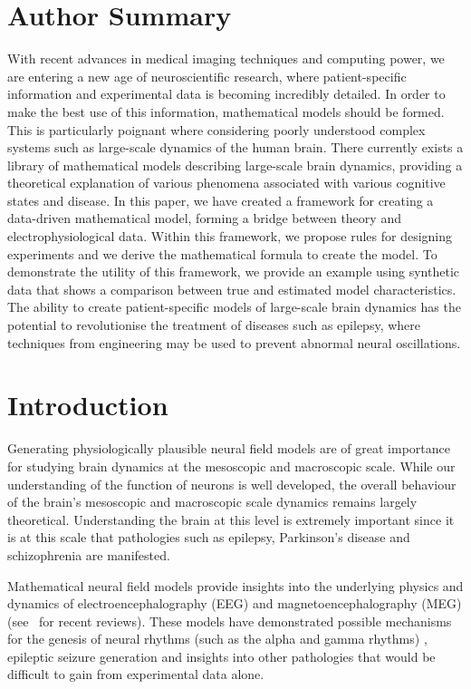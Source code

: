 \documentclass[10pt]{article}
\begin{document}
\section*{Author Summary}
With recent advances in medical imaging techniques and computing power, we are entering a new age of neuroscientific research, where patient-specific information and experimental data is becoming incredibly detailed. In order to make the best use of this information, mathematical models should be formed. This is particularly poignant where considering poorly understood complex systems such as large-scale dynamics of the human brain. There currently exists a library of mathematical models describing large-scale brain dynamics, providing a theoretical explanation of various phenomena associated with various cognitive states and disease. In this paper, we have created a framework for creating a data-driven mathematical model, forming a bridge between theory and electrophysiological data. Within this framework, we propose rules for designing experiments and we derive the mathematical formula to create the model. To demonstrate the utility of this framework, we provide an example using synthetic data that shows a comparison between true and estimated model characteristics. The ability to create patient-specific models of large-scale brain dynamics has the potential to revolutionise the treatment of diseases such as epilepsy, where techniques from engineering may be used to prevent abnormal neural oscillations.

\section*{Introduction}
Generating physiologically plausible neural field models are of great importance for studying brain dynamics at the mesoscopic and macroscopic scale. While our understanding of the function of neurons is well developed, the overall behaviour of the brain's mesoscopic and macroscopic scale dynamics remains largely theoretical. Understanding the brain at this level is extremely important since it is at this scale that pathologies such as epilepsy, Parkinson's disease and schizophrenia are manifested. 

Mathematical neural field models provide insights into the underlying physics and dynamics of electroencephalography (EEG) and magnetoencephalography (MEG) (see~\cite{Deco2008,David2003} for recent reviews). These models have demonstrated possible mechanisms for the genesis of neural rhythms (such as the alpha and gamma rhythms) \cite{Liley1999,RENNIE2000}, epileptic seizure generation \cite{DaSilva2003,Suffczynski2004,Wendling2005} and insights into other pathologies \cite{Moran2008,Schiff2009} that would be difficult to gain from experimental data alone. 
\end{document}
